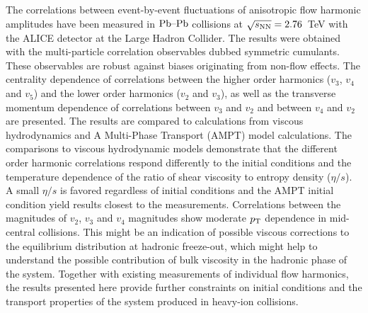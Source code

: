 The correlations between event-by-event fluctuations of anisotropic flow harmonic amplitudes
have been measured in $\textnormal{Pb--Pb}$ collisions at $\sqrt{s_{\textnormal{NN}}}=2.76$~TeV with the ALICE detector at the Large Hadron Collider. 
The results were obtained with the multi-particle correlation observables dubbed symmetric cumulants.
These observables are robust against biases originating from non-flow effects. 
The centrality dependence of correlations between the higher order harmonics ($v_3$, $v_4$ and $v_5$) and the lower order harmonics ($v_2$ and $v_3$), as well as the transverse momentum dependence of correlations between $v_3$ and $v_2$ and between $v_4$ and $v_2$ are presented. 
The results are compared to calculations from viscous hydrodynamics and  A Multi-Phase Transport ({AMPT}) model calculations.
The comparisons to viscous hydrodynamic models demonstrate that
the different order harmonic correlations respond differently to the initial conditions and the temperature dependence of the ratio of shear viscosity to entropy density ($\eta/s$). 
A small $\eta/s$ is favored regardless of initial conditions and the AMPT initial condition yield results closest to the measurements. 
Correlations between the magnitudes of $v_2$, $v_3$ and $v_4$ magnitudes show moderate $p_{\rm T}$ dependence in mid-central collisions. This might be an indication of possible viscous corrections to the equilibrium distribution at hadronic freeze-out, which might help to understand the possible contribution of bulk viscosity in the hadronic phase of the system.
Together with existing measurements of individual flow harmonics, the results presented here provide further constraints 
on initial conditions and the transport properties of the system produced in heavy-ion collisions.
